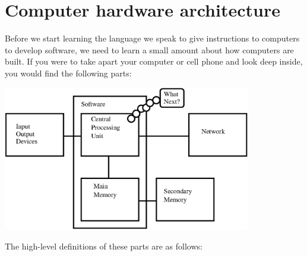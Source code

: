 \section{Computer hardware architecture}

Before we start learning the language we 
speak to give instructions to computers to 
develop software, we need to learn a small amount about 
how computers are built.  If you were to take
apart your computer or cell phone and look deep
inside, you would find the following parts:

\beforefig
\centerline{\includegraphics[height=2.50in]{figs2/arch.eps}}
\afterfig

The high-level definitions of these parts are as follows:

